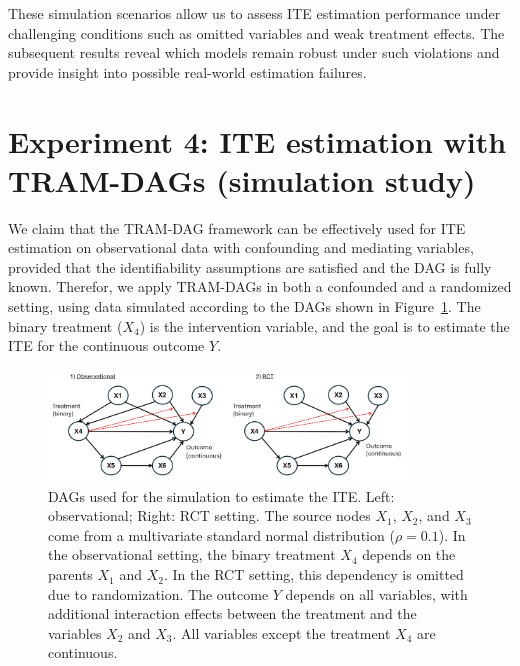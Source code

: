 These simulation scenarios allow us to assess ITE estimation performance under challenging conditions such as omitted variables and weak treatment effects. The subsequent results reveal which models remain robust under such violations and provide insight into possible real-world estimation failures.











\section{Experiment 4: ITE estimation with TRAM-DAGs (simulation study)} \label{sec:methods_experiment4}


We claim that the TRAM-DAG framework can be effectively used for ITE estimation on observational data with confounding and mediating variables, provided that the identifiability assumptions are satisfied and the DAG is fully known. Therefor, we apply TRAM-DAGs in both a confounded and a randomized setting, using data simulated according to the DAGs shown in Figure~\ref{fig:ite_dag_observational}. The binary treatment ($X_4$) is the intervention variable, and the goal is to estimate the ITE for the continuous outcome $Y$.


\begin{figure}[H]
\centering
\includegraphics[width=0.85\textwidth]{img/exp4_dags.png}
\caption{DAGs used for the simulation to estimate the ITE. Left: observational; Right: RCT setting. The source nodes $X_1$, $X_2$, and $X_3$ come from a multivariate standard normal distribution ($\rho=0.1$). In the observational setting, the binary treatment $X_4$ depends on the parents $X_1$ and $X_2$. In the RCT setting, this dependency is omitted due to randomization. The outcome $Y$ depends on all variables, with additional interaction effects between the treatment and the variables $X_2$ and $X_3$. All variables except the treatment $X_4$ are continuous.}
\label{fig:ite_dag_observational}
\end{figure}

